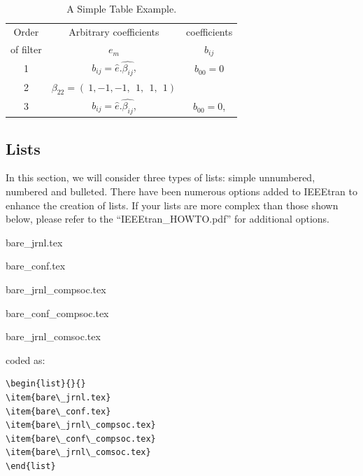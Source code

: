 \documentclass[lettersize,journal]{IEEEtran}
\begin{document}
\begin{table}
  \begin{center}
    \caption{A Simple Table Example.}
    \label{tab1}
    \begin{tabular}{| c | c | c |}
      \hline
      Order     & Arbitrary coefficients              & coefficients \\
      of filter & $e_m$                               & $b_{ij}$     \\
      \hline
      1         & $b_{ij}=\hat{e}.\hat{\beta_{ij}}$,  & $b_{00}=0$   \\
      \hline
      2         & $\beta_{22}=(~1,-1,-1,~~1,~~1,~~1)$ &              \\
      \hline
      3         & $b_{ij}=\hat{e}.\hat{\beta_{ij}}$,  & $b_{00}=0$,  \\
      \hline
    \end{tabular}
  \end{center}
\end{table}


\subsection{Lists}
\noindent In this section, we will consider three types of lists: simple unnumbered, numbered and bulleted. There have been numerous options added to IEEEtran to enhance the creation of lists. If your lists are more complex than those shown below, please refer to the  ``IEEEtran\_HOWTO.pdf'' for additional options.\\


\begin{list}{}{}
  \item{bare\_jrnl.tex}
  \item{bare\_conf.tex}
  \item{bare\_jrnl\_compsoc.tex}
  \item{bare\_conf\_compsoc.tex}
  \item{bare\_jrnl\_comsoc.tex}
\end{list}

\noindent coded as:
\begin{verbatim}
\begin{list}{}{}
\item{bare\_jrnl.tex}
\item{bare\_conf.tex}
\item{bare\_jrnl\_compsoc.tex}
\item{bare\_conf\_compsoc.tex}
\item{bare\_jrnl\_comsoc.tex}
\end{list}
\end{verbatim}
\end{document}
